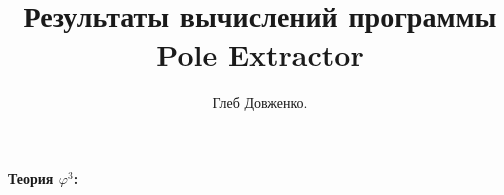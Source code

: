 \documentclass[10pt,a4paper]{article}
\title{Результаты вычислений программы Pole Extractor}
\author{Глеб Довженко.}
\begin{document}
\maketitle
\paragraph{Теория $\varphi^3$:}
\end{document}
